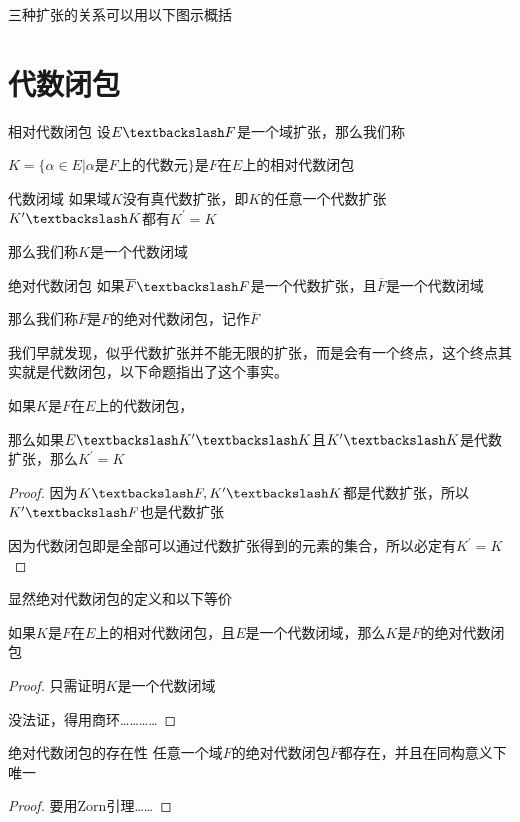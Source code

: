 \documentclass[12pt, a4paper, oneside, UTF8]{ctexbook}
\begin{document}
		三种扩张的关系可以用以下图示概括
	\section{代数闭包}
		\begin{defn}{相对代数闭包}{}
				设$E \textbackslash F$是一个域扩张，那么我们称
				
				$K  = \{\alpha \in E | \alpha \text{是}F\text{上的代数元}\}$是$F$在$E$上的相对代数闭包
		\end{defn}
		\begin{defn}{代数闭域}{}
			如果域$K$没有真代数扩张，即$K$的任意一个代数扩张$K^{\prime} \textbackslash K$都有$K^{\prime}=K$

			那么我们称$K$是一个代数闭域
		\end{defn}
		\begin{defn}{绝对代数闭包}{}
			如果$\overline{F} \textbackslash F$是一个代数扩张，且$\overline{F}$是一个代数闭域
			
			那么我们称$\overline{F}$是$F$的绝对代数闭包，记作$\overline{F}$
		\end{defn}

		我们早就发现，似乎代数扩张并不能无限的扩张，而是会有一个终点，这个终点其实就是代数闭包，以下命题指出了这个事实。

		\begin{proposition}
			如果$K$是$F$在$E$上的代数闭包，
			
			那么如果$E \textbackslash K^{\prime} \textbackslash K$且$K^{\prime} \textbackslash K$是代数扩张，那么$K^{\prime}=K$
		\end{proposition}
		\begin{proof}
			因为$K \textbackslash F,K^{\prime} \textbackslash K$都是代数扩张，所以$K^{\prime} \textbackslash F$也是代数扩张

			因为代数闭包即是全部可以通过代数扩张得到的元素的集合，所以必定有$K^{\prime} = K$
		\end{proof}
		显然绝对代数闭包的定义和以下等价
		\begin{proposition}
			如果$K$是$F$在$E$上的相对代数闭包，且$E$是一个代数闭域，那么$K$是$F$的绝对代数闭包
		\end{proposition}
		\begin{proof}
			只需证明$K$是一个代数闭域

			没法证，得用商环…………
		\end{proof}
		\begin{them}{绝对代数闭包的存在性}{}
			任意一个域$F$的绝对代数闭包$\overline{F}$都存在，并且在同构意义下唯一
		\end{them}
		\begin{proof}
			要用Zorn引理……
		\end{proof}
\ifx\allfiles\undefined
\end{document}
